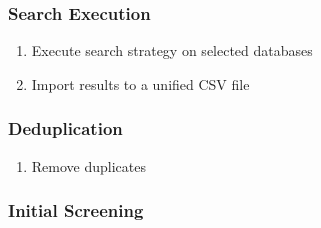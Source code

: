 \documentclass[a4paper,12pt]{article}
\begin{document}
\subsubsection{Search Execution}

\begin{enumerate}
    \item Execute search strategy on selected databases
    \item Import results to a unified CSV file
\end{enumerate}

\subsubsection{Deduplication}

\begin{enumerate}
\item Remove duplicates

\end{enumerate}

\subsubsection{Initial Screening}
\end{document}
